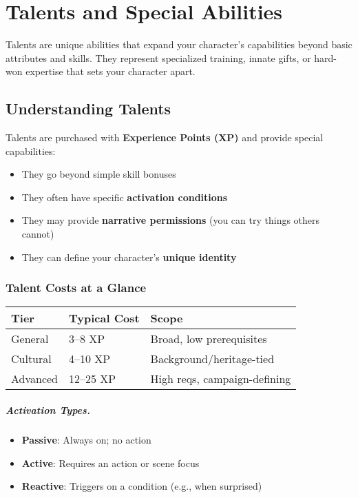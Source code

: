 
\chapter{Talents and Special Abilities}
\label{ch:talents}

\begin{multicols}{2}

Talents are unique abilities that expand your character's capabilities beyond basic attributes and skills. They represent specialized training, innate gifts, or hard-won expertise that sets your character apart.

\section{Understanding Talents}

Talents are purchased with \textbf{Experience Points (XP)} and provide special capabilities:
\begin{itemize}
\item They go beyond simple skill bonuses
\item They often have specific \textbf{activation conditions}
\item They may provide \textbf{narrative permissions} (you can try things others cannot)
\item They can define your character's \textbf{unique identity}
\end{itemize}

\subsection*{Talent Costs at a Glance}
\begin{center}
\small
\begin{tabular}{lll}
\toprule
\textbf{Tier} & \textbf{Typical Cost} & \textbf{Scope} \\
\midrule
General & 3--8 XP & Broad, low prerequisites \\
Cultural & 4--10 XP & Background/heritage-tied \\
Advanced & 12--25 XP & High reqs, campaign-defining \\
\bottomrule
\end{tabular}
\end{center}

\paragraph{Activation Types.}
\begin{itemize}
\item \textbf{Passive}: Always on; no action
\item \textbf{Active}: Requires an action or scene focus
\item \textbf{Reactive}: Triggers on a condition (e.g., when surprised)
\end{itemize}


\end{multicols}
